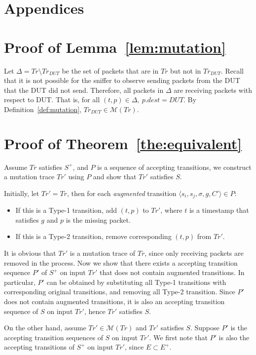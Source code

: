 \section*{Appendices}
\appendix

\section{Proof of Lemma~\ref{lem:mutation}}
Let $\Delta = Tr \setminus Tr_{DUT}$ be the set of packets that are in $Tr$
but not in $Tr_{DUT}$. Recall that it is not possible for the sniffer to
observe sending packets from the DUT that the DUT did not send. Therefore,
all packets in $\Delta$ are receiving packets with respect to DUT. That is, for
all $(t, p) \in \Delta,\ p.dest = DUT$. By Definition~\ref{def:mutation},
$Tr_{DUT} \in \mathcal{M}(Tr)$.



\section{Proof of Theorem~\ref{the:equivalent}}
Assume $Tr$ satisfies $S^+$, and $P$ is a sequence of accepting transitions,
we construct a mutation trace $Tr'$ using $P$ and show that $Tr'$ satisfies
$S$.

Initially, let $Tr'=Tr$, then for each \textit{augmented} transition $\langle s_i,
s_j, \sigma, g, C'\rangle \in P$:
\begin{itemize}
  \item If this is a Type-1 transition, add $(t, p)$ to $Tr'$, where $t$ is a
    timestamp that satisfies $g$ and $p$ is the missing packet.
  \item If this is a Type-2 transition, remove corresponding $(t, p)$ from
    $Tr'$.
\end{itemize}
It is obvious that $Tr'$ is a mutation trace of $Tr$, since only receiving
packets are removed in the process.
%
Now we show that there exists a accepting
transition sequence $P'$ of $S^+$ on input $Tr'$ that does not contain
augmented transitions.
%
In particular, $P'$ can be obtained by substituting all
Type-1 transitions with corresponding original transitions, and removing all
Type-2 transition.
%
Since $P'$ does not contain augmented transitions, it is also an accepting
transition sequence of $S$ on input $Tr'$, hence $Tr'$ satisfies $S$.

On the other hand, assume $Tr' \in \mathcal{M}(Tr)$ and $Tr'$ satisfies $S$.
Suppose $P'$ is the accepting transition sequences of $S$ on input $Tr'$.
%
We first note that $P'$ is also the accepting transitions of $S^+$ on input
$Tr'$, since $E \subset E^+$.

